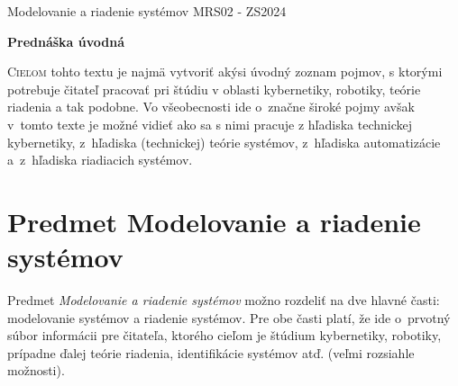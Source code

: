 \documentclass[a4paper, 10pt, ]{article}
\def\oznacenieCasti{MRS02 - ZS2024}
\begin{document}
\lstset{%
style=mystyle,
rangebeginprefix=\#\#\#\ cellB\ ,%
rangebeginsuffix=\ \#\#\#,%
rangeendprefix=\#\#\#\ cellE\ ,%
rangeendsuffix=\ \#\#\#,%
includerangemarker=false,
}





\fontsize{12pt}{22pt}\selectfont

\centerline{\textsf{Modelovanie a riadenie systémov} \hfill \textsf{\oznacenieCasti}}

\fontsize{18pt}{22pt}\selectfont





\begin{flushleft}
	\textbf{\textsf{Prednáška úvodná}}
\end{flushleft}






\normalsize

\bigskip

{\hypersetup{hidelinks}

\tableofcontents

}

\bigskip

\vspace{18pt}



\noindent
\lettrine[lines=3, nindent=0pt]{C}{ieľom} tohto textu je najmä vytvoriť akýsi úvodný zoznam pojmov, s ktorými potrebuje čitateľ pracovať pri štúdiu v oblasti kybernetiky, robotiky, teórie riadenia a tak podobne. Vo všeobecnosti ide o~značne široké pojmy avšak v~tomto texte je možné vidieť ako sa s nimi pracuje z hľadiska technickej kybernetiky, z~hľadiska (technickej) teórie systémov, z~hľadiska automatizácie a~z~hľadiska riadiacich systémov.








\section{Predmet Modelovanie a riadenie systémov}

Predmet \emph{Modelovanie a riadenie systémov} možno rozdeliť na dve hlavné časti: modelovanie systémov a riadenie systémov. Pre obe časti platí, že ide o~prvotný súbor informácii pre čitateľa, ktorého cieľom je štúdium kybernetiky, robotiky, prípadne ďalej teórie riadenia, identifikácie systémov atď. (veľmi rozsiahle možnosti).
\end{document}
